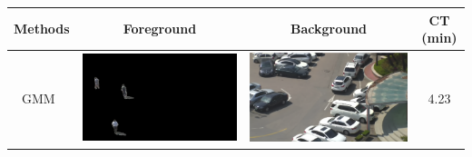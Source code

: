 \documentclass[11pt]{hyu_thesis}
\begin{document}
\begin{table}
	\centering
	\begin{tabular}{cccc}
		\hline\hline
		Methods & Foreground & Background & CT (min) \\
		\hline\hline
		GMM~\cite{Zivkovic2004} & \parbox[c]{0.35\linewidth}{\includegraphics[width=\linewidth]{bgm-fg-Zivkovic.png}} & \parbox[c]{0.35\linewidth}{\includegraphics[width=\linewidth]{bgm-bg-Zivkovic.png}} & 4.23 \\
		\hline\hline

\end{tabular}
\end{table}
\end{document}
